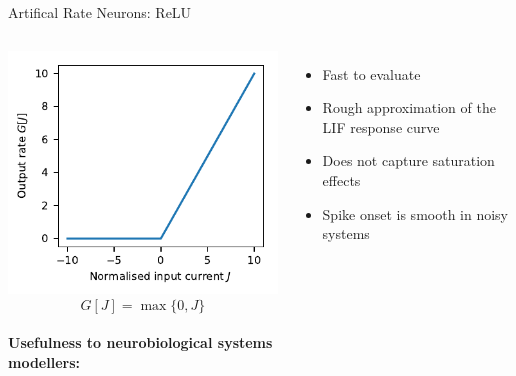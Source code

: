 \documentclass[handout,aspectratio=169]{beamer}
\begin{document}
\begin{frame}{Artifical Rate Neurons: ReLU}
	\begin{columns}
	\includegraphics[width=\textwidth]{media/nonlinearity_relu.pdf}%
	$$G[J] = \max\{0, J\}$$\\[0.5cm]
	\textbf{Usefulness to neurobiological systems\\modellers:}
	\begin{itemize}
		\item[\OPlus] Fast to evaluate
		\item[\OMeh] Rough approximation of the LIF response curve
		\item[\OMinus] Does not capture saturation effects
		\item[\OMinus] Spike onset is smooth in noisy systems
	\end{itemize}
	\end{columns}	
\end{frame}
\end{document}
